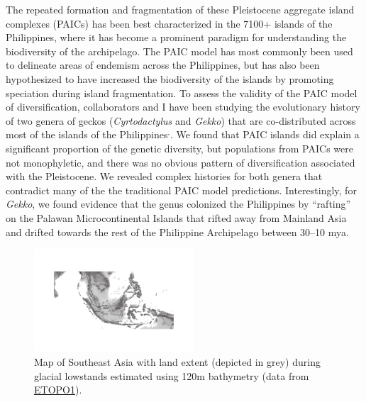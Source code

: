 \documentclass[10pt]{article}
\newcommand{\super}[1]{\ensuremath{^{\textrm{#1}}}}
\begin{document}
The repeated formation and fragmentation of these Pleistocene aggregate island
complexes (PAICs) has been best characterized in the 7100+ islands of the
Philippines, where it has become a prominent paradigm for understanding the
biodiversity of the archipelago.
The PAIC model has most commonly been used to delineate areas of endemism
across the Philippines, but has also been hypothesized to have increased the
biodiversity of the islands by promoting speciation during island
fragmentation.
To assess the validity of the PAIC model of diversification, collaborators and
I have been studying the evolutionary history of two genera of geckos
(\emph{Cyrtodactylus} and \emph{Gekko}) that are co-distributed across most of
the islands of the
Philippines\super{,}.
We found that PAIC islands did explain a significant proportion of the genetic
diversity, but populations from PAICs were not monophyletic, and there was no
obvious pattern of diversification associated with the Pleistocene.
We revealed complex histories for both genera that contradict many of the the
traditional PAIC model predictions.
Interestingly, for \emph{Gekko}, we found evidence that the genus colonized the
Philippines by ``rafting'' on the Palawan Microcontinental Islands that rifted
away from Mainland Asia and drifted towards the rest of the Philippine
Archipelago between 30--10 mya.

\begin{figure}
  \vspace{-1.5em}
  \begin{center}
    \includegraphics[width=0.53\textwidth]{sunda_shelf_small.pdf}
  \end{center}
  \vspace{-0.2em}
  \caption{Map of Southeast Asia with land extent (depicted in grey) during
  glacial lowstands estimated using 120m bathymetry (data from
  \href{http://ngdc.noaa.gov/mgg/global/global.html}{ETOPO1}).}
  \label{map}
  \vspace{-1.1em}
\end{figure}
\end{document}
